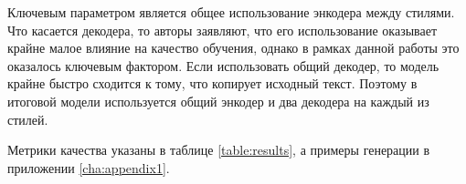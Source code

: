 
Ключевым параметром является общее использование энкодера между стилями.
Что касается декодера, то авторы заявляют, что его использование оказывает крайне малое влияние \cite{subramanian2019multipleattribute} на качество обучения, однако в рамках данной работы это оказалось ключевым фактором.
Если использовать общий декодер, то модель крайне быстро сходится к тому, что  копирует исходный текст.
Поэтому в итоговой модели используется общий энкодер и два декодера на каждый из стилей.






Метрики качества указаны в таблице \ref{table:results}, а примеры генерации в приложении \ref{cha:appendix1}.